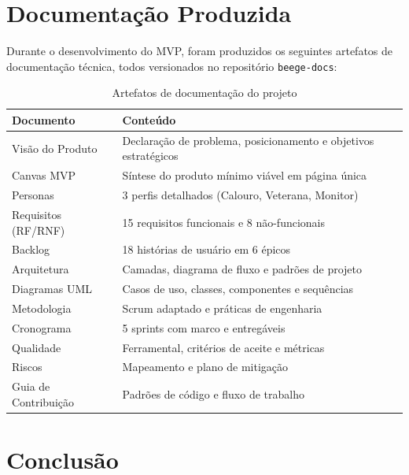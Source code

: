 \documentclass[12pt, a4paper]{article}
\begin{document}
\section{Documenta\c{c}\~{a}o Produzida}

Durante o desenvolvimento do MVP, foram produzidos os seguintes artefatos de documenta\c{c}\~{a}o t\'{e}cnica, todos versionados no reposit\'{o}rio \texttt{beege-docs}:

\begin{table}[H]
\centering
\caption{Artefatos de documenta\c{c}\~{a}o do projeto}
\begin{tabularx}{\textwidth}{l X}
\toprule
\textbf{Documento} & \textbf{Conte\'{u}do} \\
\midrule
Vis\~{a}o do Produto & Declara\c{c}\~{a}o de problema, posicionamento e objetivos estrat\'{e}gicos \\
Canvas MVP & S\'{i}ntese do produto m\'{i}nimo vi\'{a}vel em p\'{a}gina \'{u}nica \\
Personas & 3 perfis detalhados (Calouro, Veterana, Monitor) \\
Requisitos (RF/RNF) & 15 requisitos funcionais e 8 n\~{a}o-funcionais \\
Backlog & 18 hist\'{o}rias de usu\'{a}rio em 6 \'{e}picos \\
Arquitetura & Camadas, diagrama de fluxo e padr\~{o}es de projeto \\
Diagramas UML & Casos de uso, classes, componentes e sequ\^{e}ncias \\
Metodologia & Scrum adaptado e pr\'{a}ticas de engenharia \\
Cronograma & 5 sprints com marco e entreg\'{a}veis \\
Qualidade & Ferramental, crit\'{e}rios de aceite e m\'{e}tricas \\
Riscos & Mapeamento e plano de mitiga\c{c}\~{a}o \\
Guia de Contribui\c{c}\~{a}o & Padr\~{o}es de c\'{o}digo e fluxo de trabalho \\
\bottomrule
\end{tabularx}
\end{table}

\section{Conclus\~{a}o}
\end{document}

